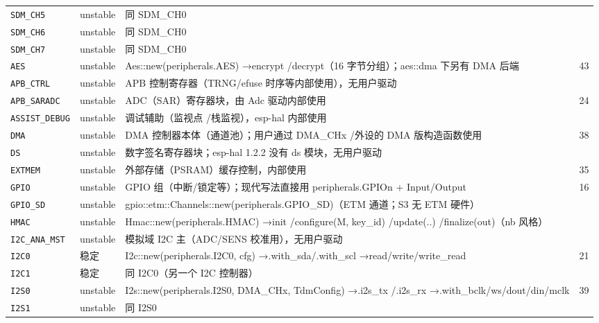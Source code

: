 \documentclass[UTF8,a4paper,11pt,fontset=fandol]{ctexart}
\newcommand{\fld}[1]{\texttt{#1}}
\begin{document}
\begin{center}
\begin{longtable}{@{}p{2.15cm}p{1.0cm}>{\raggedright\arraybackslash}p{9.4cm}p{1.65cm}@{}}
\fld{SDM\_CH5} & unstable & 同 SDM\_CH0 &  \\
\fld{SDM\_CH6} & unstable & 同 SDM\_CH0 &  \\
\fld{SDM\_CH7} & unstable & 同 SDM\_CH0 &  \\
\fld{AES} & unstable & Aes::\allowbreak new(peripherals.AES) →\allowbreak  encrypt /\allowbreak  decrypt（16 字节分组）；aes::\allowbreak dma 下另有 DMA 后端 & 43 \\
\fld{APB\_CTRL} & unstable & APB 控制寄存器（TRNG/\allowbreak efuse 时序等内部使用），无用户驱动 &  \\
\fld{APB\_SARADC} & unstable & ADC（SAR）寄存器块，由 Adc 驱动内部使用 & 24 \\
\fld{ASSIST\_DEBUG} & unstable & 调试辅助（监视点 /\allowbreak  栈监视），esp-hal 内部使用 &  \\
\fld{DMA} & unstable & DMA 控制器本体（通道池）；用户通过 DMA\_CHx /\allowbreak  外设的 DMA 版构造函数使用 & 38 \\
\fld{DS} & unstable & 数字签名寄存器块；esp-hal 1.2.2 没有 ds 模块，无用户驱动 &  \\
\fld{EXTMEM} & unstable & 外部存储（PSRAM）缓存控制，内部使用 & 35 \\
\fld{GPIO} & unstable & GPIO 组（中断/\allowbreak 锁定等）；现代写法直接用 peripherals.GPIOn + Input/\allowbreak Output & 16 \\
\fld{GPIO\_SD} & unstable & gpio::\allowbreak etm::\allowbreak Channels::\allowbreak new(peripherals.GPIO\_SD)（ETM 通道；S3 无 ETM 硬件） &  \\
\fld{HMAC} & unstable & Hmac::\allowbreak new(peripherals.HMAC) →\allowbreak  init /\allowbreak  configure(M, key\_id) /\allowbreak  update(..) /\allowbreak  finalize(out)（nb 风格） &  \\
\fld{I2C\_ANA\_MST} & unstable & 模拟域 I2C 主（ADC/\allowbreak SENS 校准用），无用户驱动 &  \\
\fld{I2C0} & 稳定 & I2c::\allowbreak new(peripherals.I2C0, cfg) →\allowbreak  .with\_sda/\allowbreak .with\_scl →\allowbreak  read/\allowbreak write/\allowbreak write\_read & 21 \\
\fld{I2C1} & 稳定 & 同 I2C0（另一个 I2C 控制器） &  \\
\fld{I2S0} & unstable & I2s::\allowbreak new(peripherals.I2S0, DMA\_CHx, TdmConfig) →\allowbreak  .i2s\_tx /\allowbreak  .i2s\_rx →\allowbreak  .with\_bclk/\allowbreak ws/\allowbreak dout/\allowbreak din/\allowbreak mclk & 39 \\
\fld{I2S1} & unstable & 同 I2S0 &  \\

\end{longtable}
\end{center}
\end{document}
